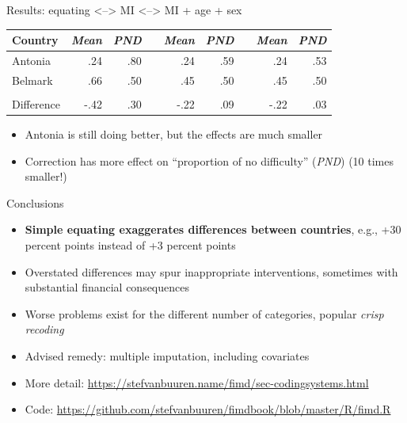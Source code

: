 \documentclass[ignorenonframetext,aspectratio=43]{beamer}
\providecommand{\tightlist}{%
  \setlength{\itemsep}{0pt}\setlength{\parskip}{0pt}}
\begin{document}
\begin{frame}{Results: equating \textless{}--\textgreater{} MI
\textless{}--\textgreater{} MI + age + sex}
\protect\hypertarget{results-equating-mi-mi-age-sex}{}

\begin{longtable}[]{@{}lrrrrrrrr@{}}
\toprule
Country & \emph{Mean} & \emph{PND} & & \emph{Mean} & \emph{PND} & &
\emph{Mean} & \emph{PND}\tabularnewline
\midrule
\endhead
Antonia & .24 & .80 & & .24 & .59 & & .24 & .53\tabularnewline
Belmark & .66 & .50 & & .45 & .50 & & .45 & .50\tabularnewline
& & & & & & & &\tabularnewline
Difference & -.42 & .30 & & -.22 & .09 & & -.22 & .03\tabularnewline
\bottomrule
\end{longtable}

\begin{itemize}
\tightlist
\item
  Antonia is still doing better, but the effects are much smaller
\item
  Correction has more effect on ``proportion of no difficulty''
  (\emph{PND}) (10 times smaller!)
\end{itemize}

\end{frame}

\begin{frame}{Conclusions}
\protect\hypertarget{conclusions}{}

\begin{itemize}
\item
  \textbf{Simple equating exaggerates differences between countries},
  e.g., +30 percent points instead of +3 percent points
\item
  Overstated differences may spur inappropriate interventions, sometimes
  with substantial financial consequences
\item
  Worse problems exist for the different number of categories, popular
  \emph{crisp recoding}
\item
  Advised remedy: multiple imputation, including covariates
\item
  More detail:
  \url{https://stefvanbuuren.name/fimd/sec-codingsystems.html}
\item
  Code:
  \url{https://github.com/stefvanbuuren/fimdbook/blob/master/R/fimd.R}
\end{itemize}

\end{frame}
\end{document}

